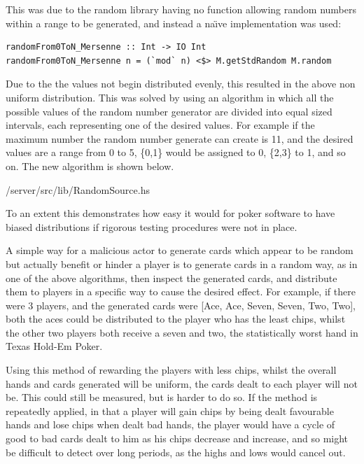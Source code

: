 This was due to the random library having no function allowing random numbers
within a range to be generated, and instead a na\"{\i}ve implementation was
used:

\begin{lstlisting}[basicstyle=\footnotesize]
randomFrom0ToN_Mersenne :: Int -> IO Int
randomFrom0ToN_Mersenne n = (`mod` n) <$> M.getStdRandom M.random
\end{lstlisting}

Due to the the values not begin distributed evenly, this resulted in the
above non uniform distribution. This was solved by using an algorithm in which
all the possible values of the random number generator are divided into equal
sized intervals, each representing one of the desired values. For example
if the maximum number the random number generate can create is 11, and the
desired values are a range from 0 to 5, \{0,1\} would be assigned to 0, \{2,3\}
to 1, and so on. The new algorithm is shown below. \parencite{website:reich2011}


                {\codelocation/server/src/lib/RandomSource.hs}

To an extent this demonstrates how easy it would for poker software to have
biased distributions if rigorous testing procedures were not in place.

A simple way for a malicious actor to generate cards which appear to be random
but actually benefit or hinder a player is to generate cards in a random
way, as in one of the above algorithms, then inspect the generated cards,
and distribute them to players in a specific way to cause the desired effect.
For example, if there were 3 players, and the generated cards were
[Ace, Ace, Seven, Seven, Two, Two], both the aces could be distributed to
the player who has the least chips, whilst the other two players both receive
a seven and two, the statistically worst hand in Texas Hold-Em Poker.

Using this method of rewarding the players with less chips, whilst the overall 
hands and cards generated will be uniform, the cards dealt to each player 
will not be. This could still be measured, but is harder to do so. If the
method is repeatedly applied, in that a player will gain chips by being dealt 
favourable hands and lose chips when dealt bad hands, the player would have 
a cycle of good to bad cards dealt to him as his chips decrease and increase, 
and so might be difficult to detect over long periods, as the highs and lows 
would cancel out.

